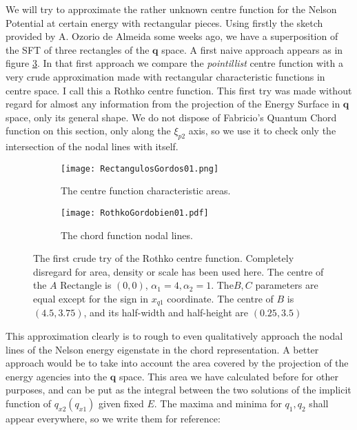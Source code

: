 \documentclass[a4paper,12pt]{article}
\newcommand{\qfase}{\mathbf{q}}
\begin{document}
We will try to approximate the rather unknown centre
function for the Nelson Potential at certain energy with rectangular
pieces. Using firstly the sketch provided by A. Ozorio de Almeida 
some weeks ago, we have a superposition of the
SFT of three rectangles of the $\qfase$ space. A first naive approach appears
as in figure \ref{RectangulosGordos}. In that first approach
we compare the \emph{pointillist} centre function with a very crude
approximation made with rectangular characteristic functions
in centre space. I call this a Rothko centre function. 
This first try was made without regard for almost any information
from the projection of the Energy Surface in $\qfase$ space,
only its general shape. We do not dispose of Fabricio's Quantum Chord
function on this section, only along the $\xi_{p2}$ axis,
so we use it to check only the intersection of the nodal lines with itself.


\begin{figure}[H]
  \centering
  \begin{subfigure}[b]{0.45\textwidth}
    \centering
          \texttt{[image: RectangulosGordos01.png]}
                \caption{The centre function characteristic areas.}
                \label{FabZeros}
  \end{subfigure}%
\begin{subfigure}[b]{0.45\textwidth}
    \centering
          \texttt{[image: RothkoGordobien01.pdf]}
                \caption{The chord function nodal lines.}
                \label{KarelZeros}
  \end{subfigure}%
\caption{The first crude try of the Rothko centre function. Completely disregard
for area, density or scale has been used here.
The centre of the  $A$ Rectangle is $(0,0)$, $\alpha_1=4, \alpha_2=1$.
The$B,C$ parameters are equal except for the sign in $x_{q1}$ coordinate.
The centre of $B$ is $(4.5, 3.75)$, and its half-width and half-height are
$(0.25,3.5)$}
\label{RectangulosGordos}
\end{figure}

This approximation clearly is to rough to even qualitatively approach
the nodal lines of the Nelson energy eigenstate in the chord representation. 
A better approach would be to take into account the area covered by the projection
of the energy agencies into the $\qfase$ space. This area we have calculated before
for other purposes, and can be put as the integral between the two solutions of
the implicit function of $q_{x2}(q_{x1})$ given fixed $E$.
The maxima and minima for $q_1, q_2$ shall appear everywhere, so we write them
for reference:
\end{document}
